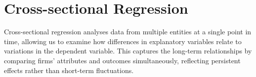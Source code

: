 \documentclass[a4paper,11pt]{report}
\begin{document}
\begin{comment}
For performance, the event study results show a statistically significant short-term decline. At the event day (t), the coefficient is –0.042 ($p < 0.10$), and it becomes even more pronounced at t+1 (coefficient $–0.047$, $p < 0.05$). These results suggest that firms experience a negative performance reaction immediately following the company name change. Profitability is positively associated with performance (coefficient $1.59e–6$, $p < 0.01$) and firm size is negatively related (coefficient $–0.066$, $p < 0.01$), possibly reflecting the slower responsiveness of larger firms to short-term shocks. Quarterly dummies again indicate significant seasonal variations in performance, with particularly negative outcomes in the third quarter (coefficient $–0.111$, $p < 0.01$).

To validate the robustness of the event study results, a placebo analysis was conducted by randomly assigning a hypothetical ``name change'' event to each firm. This synthetic event serves as a control, allowing us to test whether the observed effects in the true event study could simply be driven by chance or underlying time trends unrelated to actual name changes. The absence of statistically significant abnormal returns around the placebo event window supports the conclusion that the effects observed in the real event study are not random, and are more likely attributable to the name change itself.

Overall, the event study regression highlights clear short-term dynamics around the event date across all three firm-level characteristics. The negative post-event coefficients suggest that the events under consideration may carry adverse implications for investor sentiment for company fluency score. The high R-squared values for valuation (0.763) and liquidity (0.863) models indicate a strong explanatory power, whereas the lower R² for performance (0.02) reflects the inherently more volatile and less predictable nature of short-term performance metrics. 
\end{comment}

\section{Cross-sectional Regression}
Cross-sectional regression analyses data from multiple entities at a single point in time, allowing us to examine how differences in explanatory variables relate to variations in the dependent variable. This captures the long-term relationships by comparing firms’ attributes and outcomes simultaneously, reflecting persistent effects rather than short-term fluctuations.
\end{document}
